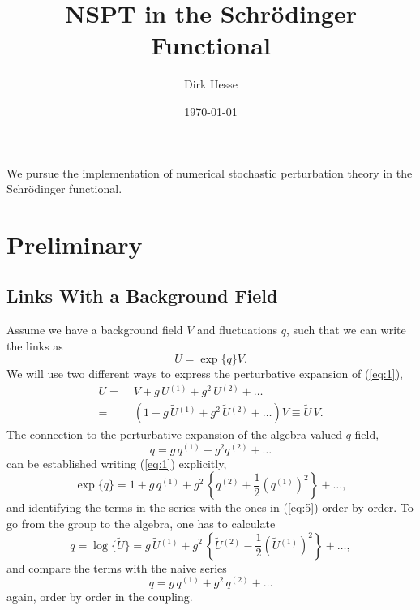 \documentclass[a4paper]{scrartcl}
\title{NSPT in the Schrödinger Functional}
\author{Dirk Hesse}
\date{\today}
\newcommand{\ord}[1]{\ensuremath{^{(#1)}}}
\begin{document}
\maketitle

We pursue the implementation of numerical stochastic perturbation
theory in the Schrödinger functional.

\section{Preliminary}
\label{sec:preliminary}

\subsection{Links With a Background Field}
\label{sec:links-with-backgr}

Assume we have a background field $V$ and fluctuations $q$, such that
we can write the links as
%
\begin{equation}
  \label{eq:1}
  U = \exp\{q\} V.
\end{equation}
%
We will use two different ways to express the perturbative expansion
of (\ref{eq:1}),
%
\begin{align}
  \label{eq:3}
  U =&\; V + g\, U\ord 1 + g^2\, U\ord 2 + \ldots\\
  \label{eq:5}
    =&\; \left (
      1 + g\, \tilde U\ord 1 + g^2\, \tilde U\ord 2 + \ldots
      \right) V \equiv \tilde U \,V.
\end{align}
%
The connection to the perturbative expansion of the algebra
valued $q$-field,
%
\begin{equation}
  \label{eq:2}
  q = g\, q\ord 1 + g^2 q \ord 2 + \ldots
\end{equation}
%
can be established writing (\ref{eq:1}) explicitly,
%
\begin{equation}
  \label{eq:4}
  \exp \{ q \} = 1 + g \, q \ord 1 + g^2\, \left\{
    q \ord 2 + \frac 1 2 \left(q\ord 1\right)^2 \right\}
   + \ldots,
\end{equation}
%
and identifying the terms in the series with the ones in
(\ref{eq:5}) order by order. To go from the group to the algebra, one
has to calculate
%
\begin{equation}
  \label{eq:6}
  q = \log\{\tilde U\} = g\, \tilde U \ord 1 + g^2 \, \left\{
    \tilde U \ord 2 - \frac 1 2 \left( \tilde U \ord 1 \right)^2
    \right \} + \ldots,
\end{equation}
%
and compare the terms with the naive series
%
\begin{equation}
  \label{eq:7}
  q = g\,q\ord 1 + g^2 \,q\ord 2 + \ldots
\end{equation}
%
again, order by order in the coupling.
\end{document}
